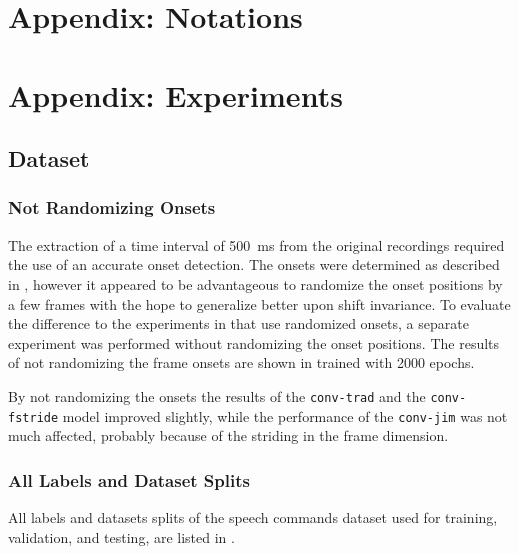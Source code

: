 



\chapter{Appendix: Notations}




\chapter{Appendix: Experiments}

\section{Dataset}

\subsection{Not Randomizing Onsets}
The extraction of a time interval of \SI{500}{\milli\second} from the original recordings required the use of an accurate onset detection.
The onsets were determined as described in , however it appeared to be advantageous to randomize the onset positions by a few frames with the hope to generalize better upon shift invariance.
To evaluate the difference to the experiments in  that use randomized onsets, a separate experiment was performed without randomizing the onset positions.
The results of not randomizing the frame onsets are shown in  trained with 2000 epochs.

By not randomizing the onsets the results of the \texttt{conv-trad} and the \texttt{conv-fstride} model improved slightly, while the performance of the \texttt{conv-jim} was not much affected, probably because of the striding in the frame dimension.

\subsection{All Labels and Dataset Splits}
All labels and datasets splits of the speech commands dataset \cite{Warden2018} used for training, validation, and testing, are listed in .




